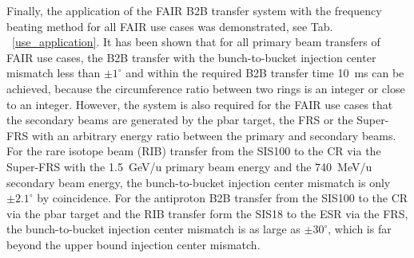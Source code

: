 Finally, the application of the FAIR B2B transfer system with the frequency beating method for all FAIR use cases was demonstrated, see Tab. ~\ref{use_application}. It has been shown that for all primary beam transfers of FAIR use cases, the B2B transfer with the bunch-to-bucket injection center mismatch less than $\pm1^\circ$ and within the required B2B transfer time \SI{10}{\ms} can be achieved, because the circumference ratio between two rings is an integer or close to an integer. However, the system is also required for the FAIR use cases that the secondary beams are generated by the pbar target, the FRS or the Super-FRS with an arbitrary energy ratio between the primary and secondary beams. For the rare isotope beam (RIB) transfer from the SIS100 to the CR via the Super-FRS with the \SI{1.5}{GeV/u} primary beam energy and the \SI{740}{MeV/u} secondary beam energy, the bunch-to-bucket injection center mismatch is only $\pm2.1^\circ$ by coincidence. For the antiproton B2B transfer from the SIS100 to the CR via the pbar target and the RIB transfer form the SIS18 to the ESR via the FRS, the bunch-to-bucket injection center mismatch is as large as $\pm30^\circ$, which is far beyond the upper bound injection center mismatch.



